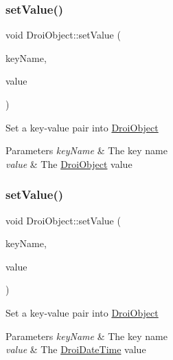\subsubsection{\texorpdfstring{set\+Value()}{setValue()}\hspace{0.1cm}{\footnotesize\ttfamily [10/11]}}
{\footnotesize\ttfamily void Droi\+Object\+::set\+Value (\begin{DoxyParamCaption}\item[{const string \&}]{key\+Name,  }\item[{\hyperlink{class_droi_object}{Droi\+Object} $\ast$}]{value }\end{DoxyParamCaption})}

Set a key-\/value pair into \hyperlink{class_droi_object}{Droi\+Object} 
\begin{DoxyParams}{Parameters}
{\em key\+Name} & The key name \\
\hline
{\em value} & The \hyperlink{class_droi_object}{Droi\+Object} value \\
\hline
\end{DoxyParams}
\mbox{\label{class_droi_object_af2c5b74a3896d0feaddc64b4fdf003c2}} 
\subsubsection{\texorpdfstring{set\+Value()}{setValue()}\hspace{0.1cm}{\footnotesize\ttfamily [11/11]}}
{\footnotesize\ttfamily void Droi\+Object\+::set\+Value (\begin{DoxyParamCaption}\item[{const string \&}]{key\+Name,  }\item[{\hyperlink{class_droi_date_time}{Droi\+Date\+Time}}]{value }\end{DoxyParamCaption})}

Set a key-\/value pair into \hyperlink{class_droi_object}{Droi\+Object} 
\begin{DoxyParams}{Parameters}
{\em key\+Name} & The key name \\
\hline
{\em value} & The \hyperlink{class_droi_date_time}{Droi\+Date\+Time} value \\
\hline
\end{DoxyParams}
\mbox{\label{class_droi_object_a4ebd656ae5fafd1f27d97a21bae95996}} 
